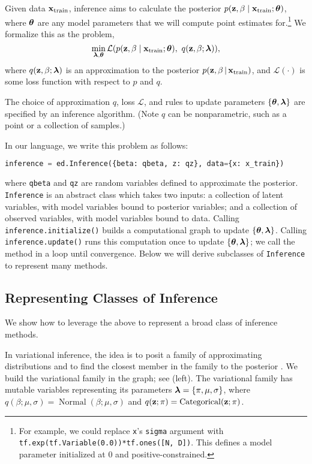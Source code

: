 Given data $\boldsymbol{\mathbf{x}}_{\text{train}}$, inference aims to calculate the
posterior
$p(\mathbf{z}, \beta\mid \mathbf{x}_{\text{train}}; \boldsymbol{\mathbf{\theta}})$, where
$\boldsymbol{\mathbf{\theta}}$ are any model parameters that we will compute point estimates
for.\footnote{%
For example, we could replace \texttt{x}'s \texttt{sigma}
argument with \texttt{tf.exp(tf.Variable(0.0))*tf.ones([N, D])}. This
defines a model parameter initialized at 0 and positive-constrained.}
We formalize this as the problem,
\begin{equation*}
\min_{\boldsymbol{\mathbf{\lambda}},\boldsymbol{\mathbf{\theta}}}
\mathcal{L}(
p(\mathbf{z}, \beta\mid \mathbf{x}_{\text{train}}; \boldsymbol{\mathbf{\theta}}),~
q(\mathbf{z}, \beta; \boldsymbol{\mathbf{\lambda}})
),
\end{equation*}
where $q(\mathbf{z}, \beta; \boldsymbol{\mathbf{\lambda}})$ is an approximation
to the posterior $p(\mathbf{z}, \beta\,|\, \boldsymbol{\mathbf{x}}_{\text{train}})$,
and $\mathcal{L}(\cdot)$ is some loss function with respect to $p$ and
$q$.

The choice of approximation $q$, loss $\mathcal{L}$, and rules to update
parameters $\{\boldsymbol{\mathbf{\theta}},\boldsymbol{\mathbf{\lambda}}\}$ are specified by an inference algorithm.
(Note $q$ can be nonparametric, such as a point or a collection of
samples.)

In our language, we write this problem as follows:
\begin{lstlisting}[language=python]
inference = ed.Inference({beta: qbeta, z: qz}, data={x: x_train})
\end{lstlisting}
where \texttt{qbeta} and \texttt{qz} are random variables defined to
approximate the posterior. \texttt{Inference} is an abstract class which
takes two inputs: a collection of latent variables, with model
variables bound to posterior variables; and a collection of observed
variables, with model variables bound to data.  Calling
\texttt{inference.initialize()} builds a computational graph to update
$\{\boldsymbol{\mathbf{\theta}},\boldsymbol{\mathbf{\lambda}}\}$. Calling \texttt{inference.update()} runs
this computation once to update
$\{\boldsymbol{\mathbf{\theta}},\boldsymbol{\mathbf{\lambda}}\}$; we call the method in a loop until
convergence. Below we will derive subclasses of \texttt{Inference}
to represent many methods.

\subsection{Representing Classes of Inference}

We show how to leverage the above to represent a broad class of
inference methods.

In variational inference, the idea is to posit a family of approximating
distributions and to find the closest member in the family to the
posterior \citep{jordan1999introduction}.
We build the variational family in the graph;
see  (left).
The variational family has mutable
variables representing its parameters $\boldsymbol{\mathbf{\lambda}}=\{\pi,\mu,\sigma\}$,
where
$q(\beta;\mu,\sigma) = \operatorname{Normal}(\beta; \mu,\sigma)$
and
$q(\boldsymbol{\mathbf{z}};\pi) = \operatorname{Categorical}(\boldsymbol{\mathbf{z}};\pi)$.

